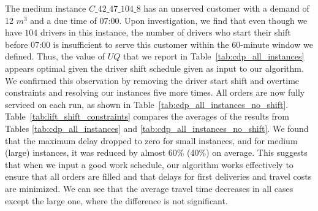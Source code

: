 \documentclass{article}
\begin{document}
The medium instance $C\_42\_47\_104\_8$ has an unserved customer with a demand of 12 $m^3$ and a due time of $07\text{:}00$. Upon investigation, we find that even though we have $104$ drivers in this instance, the number of drivers who start their shift before $07\text{:}00$ is insufficient to serve this customer within the 60-minute window we defined. Thus, the value of $UQ$ that we report in Table~\ref{tab:cdp_all_instances} appears optimal given the driver shift schedule given as input to our algorithm. We confirmed this observation by removing the driver start shift and overtime constraints and resolving our instances five more times. All orders are now fully serviced on each run, as shown in Table~\ref{tab:cdp_all_instances_no_shift}. Table~\ref{tab:lift_shift_constraints} compares the averages of the results from Tables \ref{tab:cdp_all_instances} and \ref{tab:cdp_all_instances_no_shift}. We found that the maximum delay dropped to zero for small instances, and for medium (large) instances, it was reduced by almost 60\% (40\%) on average. This suggests that when we input a good work schedule, our algorithm works effectively to ensure that all orders are filled and that delays for first deliveries and travel costs are minimized. We can see that the average travel time decreases in all cases except the large one, where the difference is not significant.
\end{document}
